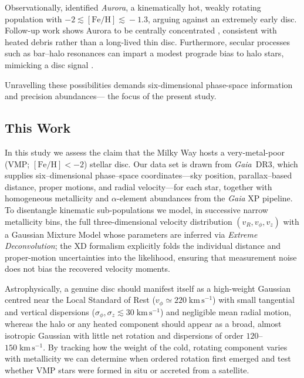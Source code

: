 \documentclass[a4paper,12pt]{article}
\begin{document}
Observationally, \citet{Belokurov2022} identified \textit{Aurora}, a kinematically hot, weakly rotating  
population with $-2\!\lesssim\![\mathrm{Fe/H}]\!\lesssim\!-1.3$, arguing against an extremely early disc.  
Follow-up work shows Aurora to be centrally concentrated \citep{Rix2022,Arentsen2020,Arentsen2020a}, 
consistent with heated debris rather than a long-lived thin disc.  
Furthermore, secular processes such as bar–halo resonances can impart a modest prograde bias to halo stars, 
mimicking a disc signal \citep{Dillamore2023}.  

Unravelling these possibilities demands six-dimensional phase-space information and precision abundances— 
the focus of the present study.

\subsection{This Work}

In this study we assess the claim that the Milky Way hosts a very-metal-poor 
(VMP; $[\mathrm{Fe/H}]<-2$) stellar disc.  Our data set is drawn from \textit{Gaia}~DR3, 
which supplies six–dimensional phase–space coordinates—sky position, parallax–based distance, 
proper motions, and radial velocity—for each star, together with homogeneous metallicity and 
$\alpha$-element abundances from the \textit{Gaia} XP pipeline.  To disentangle kinematic 
sub-populations we model, in successive narrow metallicity bins, the full three-dimensional 
velocity distribution $(v_R,v_\phi,v_z)$ with a Gaussian Mixture Model whose parameters are inferred 
via \emph{Extreme Deconvolution}; the XD formalism explicitly folds the individual distance and 
proper-motion uncertainties into the likelihood, ensuring that measurement noise does not bias 
the recovered velocity moments.

Astrophysically, a genuine disc should manifest itself as a high-weight Gaussian centred near the Local 
Standard of Rest ($v_\phi\simeq220\;\mathrm{km\,s^{-1}}$) with small tangential and vertical dispersions 
($\sigma_\phi,\sigma_z\lesssim30\;\mathrm{km\,s^{-1}}$) and negligible mean radial motion, whereas the 
halo or any heated component should appear as a broad, almost isotropic Gaussian with little net rotation 
and dispersions of order $120$–$150\;\mathrm{km\,s^{-1}}$.  By tracking how the weight of the cold, 
rotating component varies with metallicity we can determine when ordered rotation first emerged and 
test whether VMP stars were formed in situ or accreted from a satellite.
\end{document}
